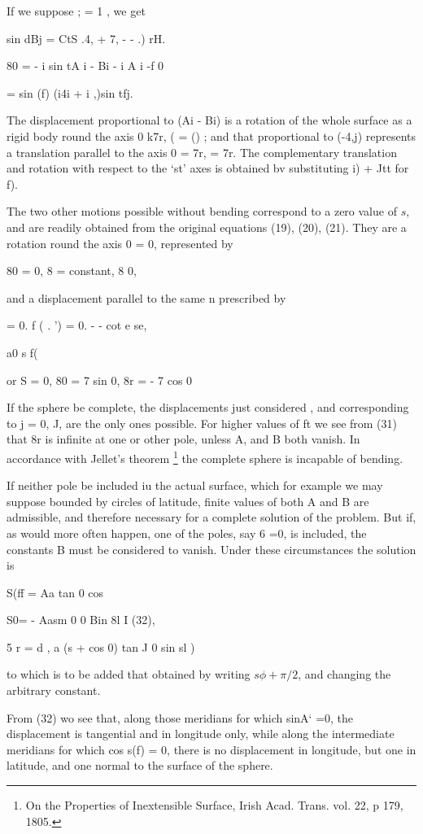 If we suppose ; = 1 , we get

sin dBj = CtS  .4, + 7, -  - .) rH.

80 = - i sin tA i - Bi - i A i -f 0

= sin (f) (i4i + i ,)sin tfj.

The displacement proportional to (Ai - Bi) is a rotation of the whole surface
as a rigid body round the axis 0 k7r, ( = () ; and that proportional to
(-4,j)
represents a translation parallel to the axis 0 = 7r,  = 7r. The
complementary translation and rotation with respect to the  ‘st' axes is obtained
bv substituting i) + Jtt for f).

The two other motions possible without bending correspond to a zero value of
\(s\), and are readily obtained from the original equations (19), (20), (21).
They are a rotation round the axis 0 = 0, represented by

80 = 0, 8 = constant, 8  0,

and a displacement parallel to the same n prescribed by

= 0. f ( .  ') = 0. - - cot e se,

a0 s f(

or S = 0, 80 = 7 sin 0, 8r = - 7 cos 0

If the sphere be complete, the displacements just considered , and
corresponding to j = 0, J, are the only ones possible. For higher values of ft
we see from (31) that 8r is infinite at one or other pole, unless A, and B both
vanish. In accordance with Jellet’s theorem
\footnote{On the Properties of Inextensible Surface,
Irish Acad. Trans. vol. 22, p 179, 1805.}
the complete sphere is incapable of bending.

If neither pole be included iu the actual surface, which for example we may
suppose bounded by circles of latitude, finite
values of both A and B are admissible, and therefore necessary for a complete
solution of the problem. But if, as would more often happen, one of the poles,
say 6 =0, is included, the constants B must be considered to vanish. Under
these circumstances the solution is

S(ff = Aa tan  0 cos

S0= - Aasm 0 0 Bin 8l I (32),

5 r = d , a (s + cos 0) tan J 0 sin sl )

to which is to be added that obtained by writing
\( s \phi + \pi/2\), and changing the arbitrary constant.

From (32) wo see that, along those meridians for which sinA‘ =0, the
displacement is tangential and in longitude only, while along the intermediate
meridians for which cos s(f) = 0, there is no displacement in longitude, but
one in latitude, and one normal to the surface of the sphere.

